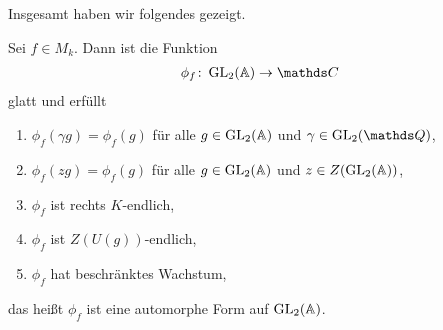 Insgesamt haben wir folgendes gezeigt.
\begin{thm}
Sei $f \in M_k$. Dann ist die Funktion
\begin{align*}
\phi_f \colon \GL_2(\A) \to \C
\end{align*}
glatt und erfüllt
\begin{enumerate}
\item $\phi_f(\gamma g)= \phi_f(g)$ für alle $g \in \operatorname{GL}_2(\mathbb{A})$ und $\gamma \in \GL_2(\Q)$,
\item $\phi_f(zg)=\phi_f(g)$ für alle $g\in \operatorname{GL}_2(\mathbb{A})$ und $z\in Z(\operatorname{GL}_2(\mathbb{A}))$,
\item $\phi_f$ ist rechts $K$-endlich,
\item $\phi_f$ ist $Z(U(g))$-endlich,
\item $\phi_f$ hat beschränktes Wachstum,
\end{enumerate}
das heißt $\phi_f$ ist eine automorphe Form auf $\operatorname{GL}_2(\mathbb{A})$.
\end{thm}